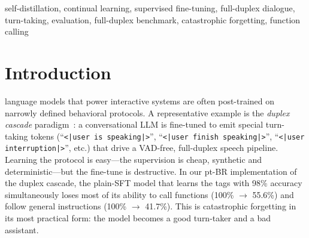 \documentclass[conference]{IEEEtran}
\begin{document}
\begin{abstract}
Because teacher-forced tag accuracy is blind to whether the protocol is actually
\emph{used} when generating, we add a free-generation evaluation built on
Full-Duplex-Bench and run it on all three variants trained in this project plus the
upstream DuplexCascade release, which we re-measure with the same harness
and which reproduces its own published turn-taking numbers (ATA 0.896 vs.\ the
published 0.858). All three variants beat that published accuracy, but the
comparison exposes what teacher forcing hid: the distill model is competitive on
turn-taking accuracy yet has by far the weakest interruption relevance (1.59 vs.\
3.56 and 4.36) and commits to the floor $13\times$ more slowly (3.29\,s vs.\
0.25\,s), because the content-KL anchors the teacher's generation style along with
its capabilities, and the teacher occasionally autocompleted the user's turn. The
same harness also identifies a property of the shared training data rather than of
any model---the system-backchannel tag occurs zero times, so that dimension is not
testable---and shows that the assistant micro-turn length distribution, which
differs between the two generations of the source dialogues, moves the
duration-gated turn-taking metric itself.
\end{abstract}

\begin{IEEEkeywords}
self-distillation, continual learning, supervised fine-tuning, full-duplex dialogue,
turn-taking, evaluation, full-duplex benchmark, catastrophic forgetting,
function calling
\end{IEEEkeywords}

\section{Introduction}
 language models that power interactive systems are often
post-trained on narrowly defined behavioral protocols. A representative example is
the \emph{duplex cascade} paradigm~\cite{duplexcascade}: a conversational LLM is
fine-tuned to emit special turn-taking tokens (``\texttt{\textless|user is speaking|>}'',
``\texttt{\textless|user finish speaking|>}'', ``\texttt{\textless|user interruption|>}'', etc.) that
drive a VAD-free, full-duplex speech pipeline. Learning the protocol is easy---the
supervision is cheap, synthetic and deterministic---but the fine-tune is destructive.
In our pt-BR implementation of the duplex cascade, the plain-SFT model that learns
the tags with 98\% accuracy simultaneously loses most of its ability to call
functions (100\% $\rightarrow$ 55.6\%) and follow general instructions
(100\% $\rightarrow$ 41.7\%). This is catastrophic forgetting in its most practical
form: the model becomes a good turn-taker and a bad assistant.
\end{document}
